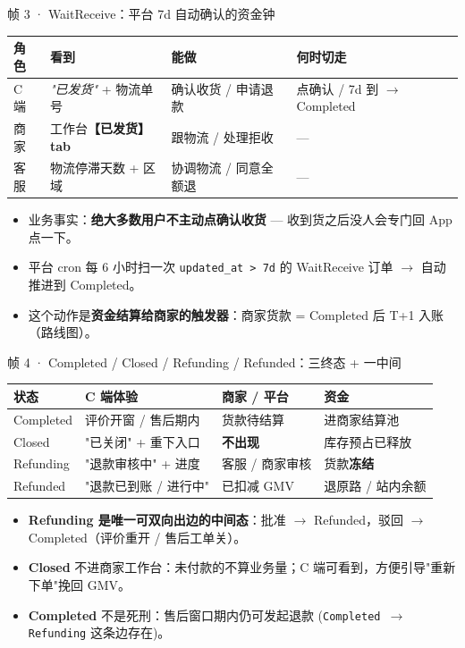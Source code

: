 \documentclass[aspectratio=169,11pt]{beamer}
\begin{document}
\begin{frame}[shrink]{帧 3 · WaitReceive：平台 7d 自动确认的资金钟}
{\footnotesize
\begin{tabular}{@{}lp{3.5cm}p{3cm}p{3cm}@{}}
\toprule
角色 & 看到 & 能做 & 何时切走 \\
\midrule
C 端 & \textit{"已发货"} + 物流单号 & 确认收货 / 申请退款 & 点确认 / 7d 到 $\to$ Completed \\
商家 & 工作台\textbf{【已发货】tab} & 跟物流 / 处理拒收 & — \\
客服 & 物流停滞天数 + 区域 & 协调物流 / 同意全额退 & — \\
\bottomrule
\end{tabular}}
\vspace{2mm}
\begin{itemize}
  \item 业务事实：\textbf{绝大多数用户不主动点确认收货} — 收到货之后没人会专门回 App 点一下。
  \item 平台 cron 每 6 小时扫一次 \texttt{updated\_at > 7d} 的 WaitReceive 订单 $\to$ 自动推进到 Completed。
  \item 这个动作是\textbf{资金结算给商家的触发器}：商家货款 = Completed 后 T+1 入账（路线图）。
\end{itemize}
\end{frame}

\begin{frame}[shrink]{帧 4 · Completed / Closed / Refunding / Refunded：三终态 + 一中间}
{\footnotesize
\begin{tabular}{@{}lp{2.8cm}p{2.8cm}p{2.5cm}@{}}
\toprule
状态 & C 端体验 & 商家 / 平台 & 资金 \\
\midrule
Completed & 评价开窗 / 售后期内 & 货款待结算 & 进商家结算池 \\
Closed    & "已关闭" + 重下入口 & \textbf{不出现} & 库存预占已释放 \\
Refunding & "退款审核中" + 进度 & 客服 / 商家审核 & 货款\textbf{冻结} \\
Refunded  & "退款已到账 / 进行中" & 已扣减 GMV & 退原路 / 站内余额 \\
\bottomrule
\end{tabular}}
\vspace{2mm}
\begin{itemize}
  \item \textbf{Refunding 是唯一可双向出边的中间态}：批准 $\to$ Refunded，驳回 $\to$ Completed（评价重开 / 售后工单关）。
  \item \textbf{Closed} 不进商家工作台：未付款的不算业务量；C 端可看到，方便引导"重新下单"挽回 GMV。
  \item \textbf{Completed} 不是死刑：售后窗口期内仍可发起退款 (\texttt{Completed $\to$ Refunding} 这条边存在)。
\end{itemize}
\end{frame}
\end{document}
